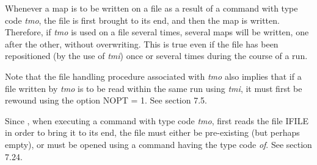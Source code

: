          Whenever a map is to be written on a file as a result of a command
with type code {\em tmo}, the file is first brought to its end, and then the map
is written.  Therefore, if {\em tmo } is used on a file several times, several
maps will be written, one after the other, without overwriting.  This is
true even if the file has been repositioned (by the use of {\em tmi}\/) once or
several times during the course of a \Mary run.

         Note that the file handling procedure associated with {\em tmo} also
implies that if a file written by {\em tmo } is to be read within the same \Mary
run using {\em tmi}, it must first be rewound using the option NOPT = 1.  See
section 7.5.

     Since \Mary $\!\!$, when executing a command with type code {\em tmo},
first reads the file IFILE in order to bring it to its end, the file must
either be pre-existing (but perhaps empty), or must be opened using a
command having the type code {\em of}.  See section 7.24.

\newpage
